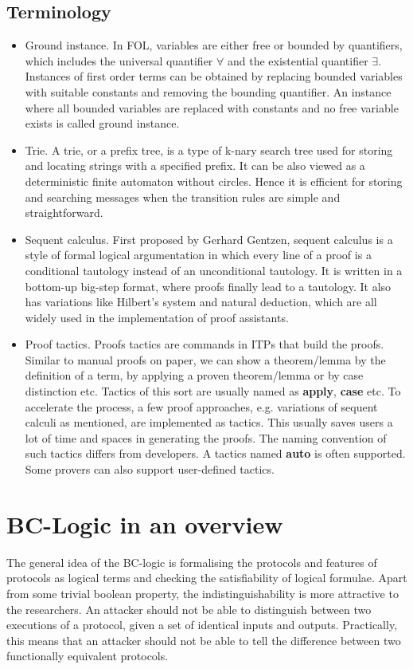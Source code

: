 \documentclass[conference]{IEEEtran}
\begin{document}
\subsection{Terminology}
\begin{itemize}
    \item Ground instance. In FOL, variables are either free or bounded by quantifiers, which includes the universal quantifier $\forall$ and the existential quantifier $\exists$. Instances of first order terms can be obtained by replacing bounded variables with suitable constants and removing the bounding quantifier. An instance where all bounded variables are replaced with constants and no free variable exists is called ground instance.\cite{logic2}
    \item Trie. A trie, or a prefix tree, is a type of k-nary search tree used for storing and locating strings with a specified prefix. It can be also viewed as a deterministic finite automaton without circles. Hence it is efficient for storing and searching messages when the transition rules are simple and straightforward.\cite{trie}
    \item Sequent calculus. First proposed by Gerhard Gentzen, sequent calculus is a style of formal logical argumentation in which every line of a proof is a conditional tautology instead of an unconditional tautology. It is written in a bottom-up big-step format, where proofs finally lead to a tautology. It also has variations like Hilbert's system and natural deduction, which are all widely used in the implementation of proof assistants.\cite{logic1}
    \item Proof tactics. Proofs tactics are commands in ITPs that build the proofs. Similar to manual proofs on paper, we can show a theorem/lemma by the definition of a term, by applying a proven theorem/lemma or by case distinction etc. Tactics of this sort are usually named as \textbf{apply}, \textbf{case} etc. To accelerate the process, a few proof approaches, e.g. variations of sequent calculi as mentioned, are implemented as tactics. This usually saves users a lot of time and spaces in generating the proofs. The naming convention of such tactics differs from developers. A tactics named \textbf{auto} is often supported. Some provers can also support user-defined tactics.\cite{LeanTactics}
\end{itemize}

\section{BC-Logic in an overview}
The general idea of the BC-logic is formalising the protocols and features of protocols as logical terms and checking the satisfiability of logical formulae. Apart from some trivial boolean property, the indistinguishability is more attractive to the researchers. An attacker should not be able to distinguish between two executions of a protocol, given a set of identical inputs and outputs. Practically, this means that an attacker should not be able to tell the difference between two functionally equivalent protocols.
\end{document}
